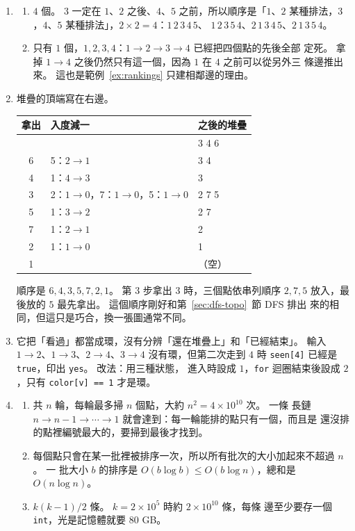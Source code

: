 \begin{enumerate}
\item
\begin{enumerate}
\item $4$ 個。 $3$ 一定在 $1$、$2$ 之後、$4$、$5$ 之前，所以順序是「$1$、$2$
某種排法，$3$，$4$、$5$ 某種排法」，$2 \times 2 = 4$：$1\,2\,3\,4\,5$、
$1\,2\,3\,5\,4$、$2\,1\,3\,4\,5$、$2\,1\,3\,5\,4$。
\item 只有 $1$ 個，$1, 2, 3, 4$：$1 \to 2 \to 3 \to 4$ 已經把四個點的先後全部
定死。 拿掉 $1 \to 4$ 之後仍然只有這一個，因為 $1$ 在 $4$ 之前可以從另外三
條邊推出來。 這也是範例~\ref{ex:rankings} 只建相鄰邊的理由。
\end{enumerate}

\item 堆疊的頂端寫在右邊。
\begin{center}
\begin{tabular}{cll}
\toprule
拿出 & 入度減一 & 之後的堆疊 \\
\midrule
 & & 3 4 6 \\
6 & 5：$2 \to 1$ & 3 4 \\
4 & 1：$4 \to 3$ & 3 \\
3 & 2：$1 \to 0$，7：$1 \to 0$，5：$1 \to 0$ & 2 7 5 \\
5 & 1：$3 \to 2$ & 2 7 \\
7 & 1：$2 \to 1$ & 2 \\
2 & 1：$1 \to 0$ & 1 \\
1 & & （空）\\
\bottomrule
\end{tabular}
\end{center}
順序是 $6, 4, 3, 5, 7, 2, 1$。 第 3 步拿出 $3$ 時，三個點依串列順序 $2, 7, 5$
放入，最後放的 $5$ 最先拿出。 這個順序剛好和第~\ref{sec:dfs-topo}~節 DFS 排出
來的相同，但這只是巧合，換一張圖通常不同。

\item 它把「看過」都當成環，沒有分辨「還在堆疊上」和「已經結束」。 輸入
$1 \to 2$、$1 \to 3$、$2 \to 4$、$3 \to 4$ 沒有環，但第二次走到 $4$ 時
\texttt{seen[4]} 已經是 \texttt{true}，印出 \texttt{yes}。 改法：用三種狀態，
進入時設成 $1$，\texttt{for} 迴圈結束後設成 $2$，只有 \texttt{color[v] == 1}
才是環。

\item
\begin{enumerate}
\item 共 $n$ 輪，每輪最多掃 $n$ 個點，大約 $n^2 = 4 \times 10^{10}$ 次。 一條
長鏈 $n \to n - 1 \to \cdots \to 1$ 就會達到：每一輪能排的點只有一個，而且是
還沒排的點裡編號最大的，要掃到最後才找到。
\item 每個點只會在某一批裡被排序一次，所以所有批次的大小加起來不超過 $n$。 一
批大小 $b$ 的排序是 $O(b \log b) \le O(b \log n)$，總和是 $O(n \log n)$。
\item $k(k - 1)/2$ 條。 $k = 2 \times 10^5$ 時約 $2 \times 10^{10}$ 條，每條
邊至少要存一個 \texttt{int}，光是記憶體就要 $80$ GB。
\end{enumerate}


\end{enumerate}
